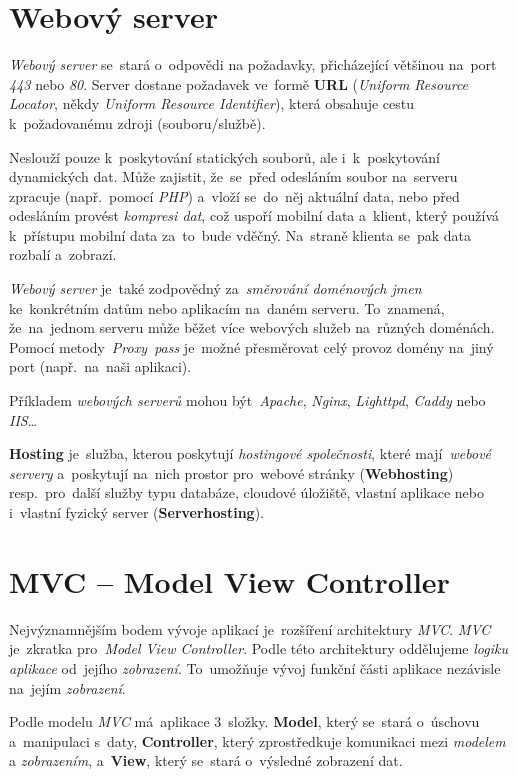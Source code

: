 \documentclass[11pt,a4paper]{report}
\begin{document}
        \section{Webový server}
            \emph{Webový server} se~stará o~odpovědi na požadavky, přicházející většinou na~port \emph{443} nebo \emph{80}. Server dostane požadavek ve~formě \textbf{URL} (\emph{Uniform Resource Locator}, někdy \emph{Uniform Resource Identifier}), která obsahuje cestu k~požadovanému zdroji (souboru/službě).

            Neslouží pouze k~poskytování statických souborů, ale i~k~poskytování dynamických dat. Může zajistit, že~se~před odesláním soubor na~serveru zpracuje (např.~pomocí \emph{PHP}) a~vloží se~do~něj aktuální data, nebo před odesláním provést \emph{kompresi dat}, což uspoří mobilní data a~klient, který používá k~přístupu mobilní data za~to~bude vděčný. Na~straně klienta se~pak data rozbalí a~zobrazí.

            \emph{Webový server} je~také zodpovědný za~\emph{směrování doménových jmen} ke~konkrétním datům nebo aplikacím na~daném serveru. To~znamená, že~na~jednom serveru může běžet více webových služeb na~různých doménách. Pomocí metody~\emph{Proxy~pass} je~možné přesměrovat celý provoz domény na~jiný port (např.~na~naši aplikaci). \cite{webserver:mdn}

            Příkladem \emph{webových serverů} mohou být~\emph{Apache}, \emph{Nginx}, \emph{Lighttpd}, \emph{Caddy} nebo \emph{IIS}\dots

            \textbf{Hosting} je~služba, kterou poskytují \emph{hostingové společnosti}, které mají~\emph{webové servery} a~poskytují na~nich prostor pro~webové stránky (\textbf{Webhosting}) resp.~pro~další služby typu databáze, cloudové úložiště, vlastní aplikace nebo i~vlastní fyzický server (\textbf{Serverhosting}). \cite{dockernginxperformance}
        
        \section{MVC -- Model View Controller}
        \label{MVC}
            Nejvýznamnějším bodem vývoje aplikací je~rozšíření architektury \emph{MVC}. \emph{MVC} je~zkratka pro~\emph{Model View Controller}. Podle této architektury oddělujeme \emph{logiku aplikace} od~jejího \emph{zobrazení}. To~umožňuje vývoj funkční části aplikace nezávisle na~jejím \emph{zobrazení}.

            Podle modelu \emph{MVC} má~aplikace 3~složky. \textbf{Model}, který se~stará o~úschovu a~manipulaci s~daty, \textbf{Controller}, který zprostředkuje komunikaci mezi \emph{modelem} a \emph{zobrazením}, a~\textbf{View}, který se~stará o~výsledné zobrazení dat. \cite{MVC}
            
\end{document}
